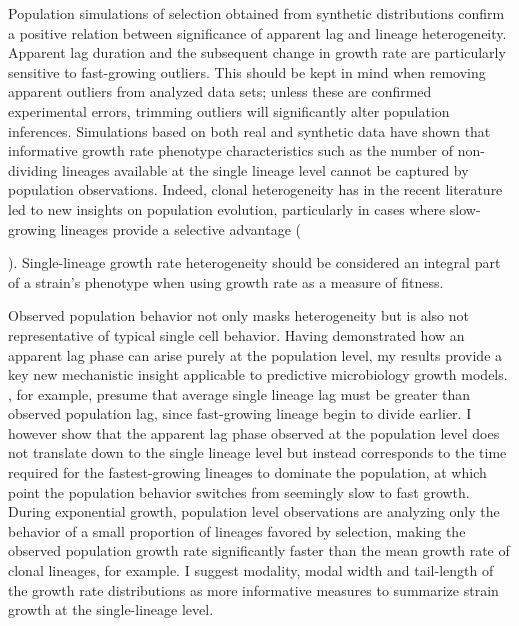 \documentclass{bioinfo}
\begin{document}
Population simulations of selection obtained from synthetic distributions confirm a positive relation between significance of apparent lag and lineage heterogeneity. Apparent lag duration and the subsequent change in growth rate are particularly sensitive to fast-growing outliers. This should be kept in mind when removing apparent outliers from analyzed data sets; unless these are confirmed experimental errors, trimming outliers will significantly alter population inferences. Simulations based on both real and synthetic data have shown that informative growth rate phenotype characteristics such as the number of non-dividing lineages available at the single lineage level cannot be captured by population observations. Indeed, clonal heterogeneity has in the recent literature led to new insights on population evolution, particularly in cases where slow-growing lineages provide a selective advantage ({\citealp{Dijk15,Ding12,Levy12}). Single-lineage growth rate heterogeneity should be considered an integral part of a strain's phenotype when using growth rate as a measure of fitness.

Observed population behavior not only masks heterogeneity but is also not representative of typical single cell behavior. Having demonstrated how an apparent lag phase can arise purely at the population level, my results provide a key new mechanistic insight applicable to predictive microbiology growth models. \cite{Robinson01}, for example, presume that average single lineage lag must be greater than observed population lag, since fast-growing lineage begin to divide earlier. I however show that the apparent lag phase observed at the population level does not translate down to the single lineage level but instead corresponds to the time required for the fastest-growing lineages to dominate the population, at which point the population behavior switches from seemingly slow to fast growth. During exponential growth, population level observations are analyzing only the behavior of a small proportion of lineages favored by selection, making the observed population growth rate significantly faster than the mean growth rate of clonal lineages, for example. I suggest modality, modal width and tail-length of the growth rate distributions as more informative measures to summarize strain growth at the single-lineage level. 

}
\end{document}
